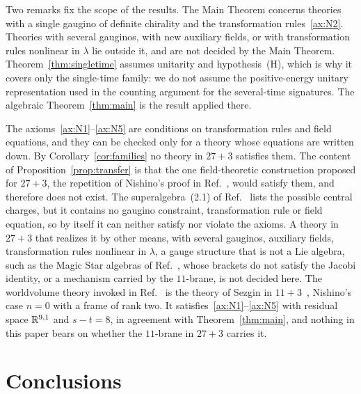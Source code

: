 Two remarks fix the scope of the results. The Main Theorem concerns theories with a single gaugino of definite chirality and the transformation rules~\ref{ax:N2}. Theories with several gauginos, with new auxiliary fields, or with transformation rules nonlinear in $\lambda$ lie outside it, and are not decided by the Main Theorem. Theorem~\ref{thm:singletime} assumes unitarity and hypothesis~(H), which is why it covers only the single-time family: we do not assume the positive-energy unitary representation used in the counting argument for the several-time signatures. The algebraic Theorem~\ref{thm:main} is the result applied there.

\begin{remark}
\label{rem:applicability}
The axioms~\ref{ax:N1}--\ref{ax:N5} are conditions on transformation rules and field equations, and they can be checked only for a theory whose equations are written down. By Corollary~\ref{cor:families} no theory in $27+3$ satisfies them. The content of Proposition~\ref{prop:transfer} is that the one field-theoretic construction proposed for $27+3$, the repetition of Nishino's proof in Ref.~\cite[Sec.~III.A]{RiosMarraniChester2019}, would satisfy them, and therefore does not exist. The superalgebra~(2.1) of Ref.~\cite{RiosMarraniChester2020} lists the possible central charges, but it contains no gaugino constraint, transformation rule or field equation, so by itself it can neither satisfy nor violate the axioms. A theory in $27+3$ that realizes it by other means, with several gauginos, auxiliary fields, transformation rules nonlinear in $\lambda$, a gauge structure that is not a Lie algebra, such as the Magic Star algebras of Ref.~\cite{TruiniMarraniRios2019}, whose brackets do not satisfy the Jacobi identity, or a mechanism carried by the $11$-brane, is not decided here. The worldvolume theory invoked in Ref.~\cite{RiosMarraniChester2020} is the theory of Sezgin in $11+3$~\cite{Sezgin1997}, Nishino's case $n=0$ with a frame of rank two. It satisfies~\ref{ax:N1}--\ref{ax:N5} with residual space $\mathbb{R}^{9,1}$ and $s-t=8$, in agreement with Theorem~\ref{thm:main}, and nothing in this paper bears on whether the $11$-brane in $27+3$ carries it.
\end{remark}

\section{Conclusions}
\label{sec:conclusions}

